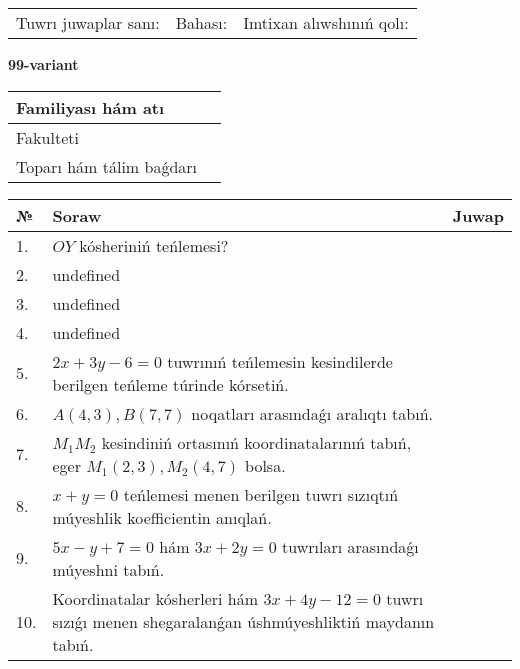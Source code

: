 \documentclass{article}
\begin{document}
\vspace{0.7cm}

\begin{tabular}{lll}
Tuwrı juwaplar sanı: \underline{\hspace{1cm}} & 
Bahası: \underline{\hspace{1cm}} & 
Imtixan alıwshınıń qolı: \underline{\hspace{2cm}} \\
\end{tabular}

\egroup

\newpage


\textbf{99-variant}\\

\bgroup
\def\arraystretch{1.6} %

\begin{tabular}{|m{5.7cm}|m{9.5cm}|}
\hline
Familiyası hám atı & \\
\hline
Fakulteti  & \\
\hline
Toparı hám tálim baǵdarı  & \\
\hline
\end{tabular}

\vspace{0.7cm}

\begin{tabular}{|m{0.7cm}|m{10cm}|m{4cm}|}
\hline
№ & Soraw & Juwap \\
\hline
1. & \(OY\) kósheriniń teńlemesi? &  \\
\hline
2. & undefined &  \\
\hline
3. & undefined &  \\
\hline
4. & undefined &  \\
\hline
5. & \(2 x + 3 y - 6 = 0\) tuwrınıń teńlemesin kesindilerde berilgen teńleme túrinde kórsetiń. &  \\
\hline
6. & \(A (4, 3), B (7, 7)\) noqatları arasındaǵı aralıqtı tabıń. &  \\
\hline
7. & \(M_{1}M_{2}\) kesindiniń ortasınıń koordinatalarınıń tabıń, eger \(M_{1} (2, 3), M_{2} (4, 7)\) bolsa. &  \\
\hline
8. & \(x + y = 0\) teńlemesi menen berilgen tuwrı sızıqtıń múyeshlik koefficientin anıqlań. &  \\
\hline
9. & \(5 x - y + 7 = 0\) hám \(3 x + 2 y = 0\) tuwrıları arasındaǵı múyeshni tabıń. &  \\
\hline
10. & Koordinatalar kósherleri hám \( 3 x + 4 y - 12 = 0 \) tuwrı sızıǵı menen shegaralanǵan úshmúyeshliktiń maydanın tabıń. & \\
\hline
\end{tabular}
\end{document}
